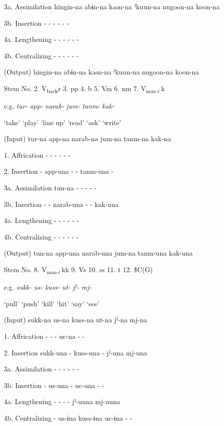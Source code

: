 3a.  Assimilation  hingin-na  abɨn-na  kəən-na  ˀkuun-na  nugoon-na  koon-na

3b.  Insertion  {}-  {}-  {}-  {}-  {}-  {}-

4a.  Lengthening  {}-  {}-  {}-  {}-  {}-  {}-

4b.  Centralizing  {}-  {}-  {}-  {}-  {}-  {}-

  (Output)  hingin-na  abɨn-na  kəən-na  ˀkuun-na  nugoon-na  koon-na

Stem No.  2. V\textsubscript{back}r  3. pp  4. b  5. Vm  6. nm  7. V\textsubscript{non-}\textit{\textsubscript{i} }k

  e.g.  \textit{tur-}  \textit{app-}  \textit{narab-}  \textit{jum-}  \textit{tanm-}  \textit{kak-}

    ‘take’  ‘play’  ‘line up’  ‘read’  ‘ask’  ‘write’

  (Input)  tur-na  app-na  narab-na  jum-na  tanm-na  kak-na

1.  Affrication  {}-  {}-  {}-  {}-  {}-  {}-

2.  Insertion  {}-  app-una  {}-  {}-  tanm-una  {}-

3a.  Assimilation  tun-na  {}-  {}-  {}-  {}-  {}-

3b.  Insertion  {}-  {}-  narab-una  {}-  {}-  kak-una

4a.  Lengthening  {}-  {}-  {}-  {}-  {}-  {}-

4b.  Centralizing  {}-  {}-  {}-  {}-  {}-  {}-

  (Output)  tun-na  app-una  narab-una  jum-na  tanm-una  kak-una

  Stem No.  8. V\textsubscript{non-}\textit{\textsubscript{i} }kk  9. Vs  10. ss  11. t  12. \$C(G)

  e.g.  \textit{sukk-}  \textit{us-}  \textit{kuss-}  \textit{ut-}  \textit{jˀ-}  \textit{mj-}

    ‘pull’  ‘push’  ‘kill’  ‘hit’  ‘say’  ‘see’

  (Input)  sukk-na  us-na  kuss-na  ut-na  jˀ-na  mj-na

1.  Affrication  {}-  {}-  {}-  uc-na  {}-  {}-

2.  Insertion  sukk-una  {}-  kuss-una  {}-  jˀ-una  mj-una

3a.  Assimilation  {}-  {}-  {}-  {}-  {}-  {}-

3b.  Insertion  {}-  us-una  {}-  uc-una  {}-  {}-

4a.  Lengthening  {}-  {}-  {}-  {}-  jˀ-uuna  mj-uuna

4b.  Centralizing  {}-  us-ɨna  kuss-ɨna  uc-ɨna  {}-  {}-

